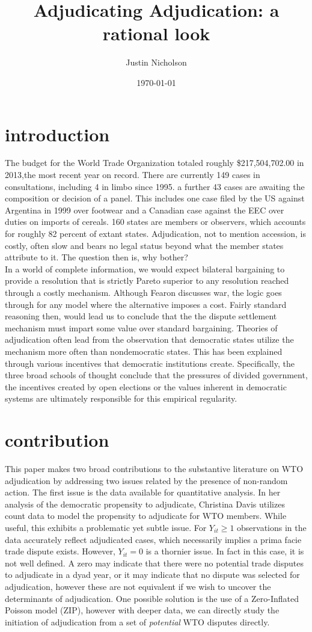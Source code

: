 \documentclass[]{article}
\author{Justin Nicholson}
\date{\today}
\title{Adjudicating Adjudication: a rational look}
\begin{document}
\section{introduction}
The budget for the World Trade Organization totaled roughly \$217,504,702.00 in 2013,the most recent year on record. There are currently 149 cases in consultations, including 4 in limbo since 1995. a further 43 cases are awaiting the composition or decision of a panel. This includes one case filed by the US against Argentina in 1999 over footwear and a Canadian case against the EEC over duties on imports of cereals. 160 states are members or observers, which accounts for roughly 82 percent of extant states. Adjudication, not to mention accession, is costly, often slow and bears no legal status beyond what the member states attribute to it. The question then is, why bother?  \\

In a world of complete information, we would expect bilateral bargaining to provide a resolution that is strictly Pareto superior to any resolution reached through a costly mechanism. Although Fearon discusses war, the logic goes through for any model where the alternative imposes a cost. Fairly standard reasoning then, would lead us to conclude that the the dispute settlement mechanism must impart some value over standard bargaining. Theories of adjudication often lead from the observation that democratic states utilize the mechanism more often than nondemocratic states. This has been explained through various incentives that democratic institutions create. Specifically, the three broad schools of thought conclude that the pressures of divided government, the incentives created by open elections or the values inherent in democratic systems are ultimately responsible for this empirical regularity. \\
 
\section{contribution}
This paper makes two broad contributions to the substantive literature on WTO adjudication by addressing two issues related by the presence of non-random action. The first issue is the data available for quantitative analysis. In her analysis of the democratic propensity to adjudicate, Christina Davis utilizes count data to model the propensity to adjudicate for WTO members. While useful, this exhibits a problematic yet subtle issue.  For $Y_{it}\geq 1$ observations in the data accurately reflect adjudicated cases, which necessarily implies a prima facie trade dispute exists. However, $Y_{it} = 0$ is a thornier issue. In fact in this case, it is not well defined. A zero may indicate that there were no potential trade disputes to adjudicate in a dyad year, or it may indicate that no dispute was selected for adjudication, however these are not equivalent if we wish to uncover the determinants of adjudication. One possible solution is the use of a Zero-Inflated Poisson model (ZIP), however with deeper data, we can directly study the initiation of adjudication from a set of \textit{potential} WTO disputes directly. \\
\end{document}
